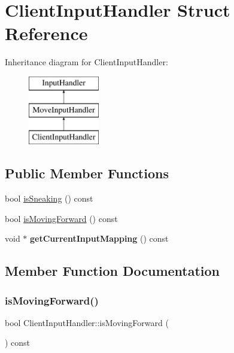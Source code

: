 \hypertarget{struct_client_input_handler}{}\section{Client\+Input\+Handler Struct Reference}
\label{struct_client_input_handler}
Inheritance diagram for Client\+Input\+Handler\+:\begin{figure}[H]
\begin{center}
\leavevmode
\includegraphics[height=3.000000cm]{struct_client_input_handler}
\end{center}
\end{figure}
\subsection*{Public Member Functions}
\begin{DoxyCompactItemize}
\item 
bool \mbox{\hyperlink{struct_client_input_handler_aaa32573b74b0fa24437c2a3b4d56c0b8}{is\+Sneaking}} () const
\item 
bool \mbox{\hyperlink{struct_client_input_handler_a92c1f5c6bc2a1fc9de83abdcb75dd318}{is\+Moving\+Forward}} () const
\item 
\mbox{\label{struct_client_input_handler_aaa4896ecee42f078d10aeb5d0e6f1bfc}} 
void $\ast$ {\bfseries get\+Current\+Input\+Mapping} () const
\end{DoxyCompactItemize}


\subsection{Member Function Documentation}
\mbox{\label{struct_client_input_handler_a92c1f5c6bc2a1fc9de83abdcb75dd318}} 
\subsubsection{\texorpdfstring{isMovingForward()}{isMovingForward()}}
{\footnotesize\ttfamily bool Client\+Input\+Handler\+::is\+Moving\+Forward (\begin{DoxyParamCaption}{ }\end{DoxyParamCaption}) const}

